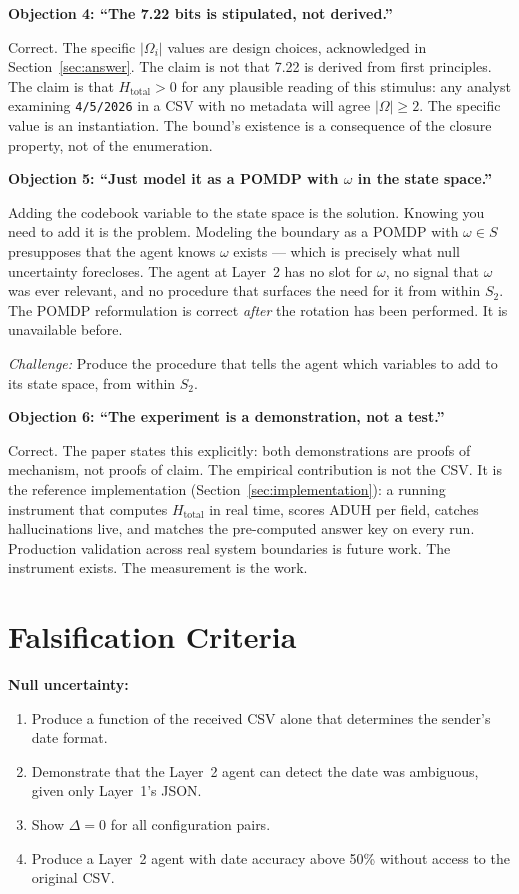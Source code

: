 \documentclass[11pt,a4paper]{article}
\begin{document}
\textbf{Objection 4: ``The 7.22 bits is stipulated, not derived.''}

Correct. The specific $|\Omega_i|$ values are design choices, 
acknowledged in Section~\ref{sec:answer}. The claim is not that 
7.22 is derived from first principles. The claim is that 
$H_{\text{total}} > 0$ for any plausible reading of this 
stimulus: any analyst examining \texttt{4/5/2026} in a CSV with no 
metadata will agree $|\Omega| \geq 2$. The specific value is an 
instantiation. The bound's existence is a consequence of the 
closure property, not of the enumeration.

\textbf{Objection 5: ``Just model it as a POMDP with $\omega$ in the 
state space.''}

Adding the codebook variable to the state space is the solution. 
Knowing you need to add it is the problem. Modeling the boundary as 
a POMDP with $\omega \in S$ presupposes that the agent knows $\omega$ 
exists --- which is precisely what null uncertainty forecloses. The 
agent at Layer~2 has no slot for $\omega$, no signal that $\omega$ 
was ever relevant, and no procedure that surfaces the need for it 
from within $S_2$. The POMDP reformulation is correct \emph{after} 
the rotation has been performed. It is unavailable before.

\emph{Challenge:} Produce the procedure that tells the agent which 
variables to add to its state space, from within $S_2$.

\textbf{Objection 6: ``The experiment is a demonstration, not a 
test.''}

Correct. The paper states this explicitly: both demonstrations are 
proofs of mechanism, not proofs of claim. The empirical contribution 
is not the CSV. It is the reference implementation 
(Section~\ref{sec:implementation}): a running instrument that 
computes $H_{\text{total}}$ in real time, scores ADUH per field, 
catches hallucinations live, and matches the pre-computed answer key 
on every run. Production validation across real system boundaries is 
future work. The instrument exists. The measurement is the work.


\section{Falsification Criteria}

\textbf{Null uncertainty:}
\begin{enumerate}
  \item Produce a function of the received CSV alone that determines 
  the sender's date format.
  \item Demonstrate that the Layer~2 agent can detect the date was 
  ambiguous, given only Layer~1's JSON.
  \item Show $\Delta = 0$ for all configuration pairs.
  \item Produce a Layer~2 agent with date accuracy above 50\% without 
  access to the original CSV.
\end{enumerate}
\end{document}
